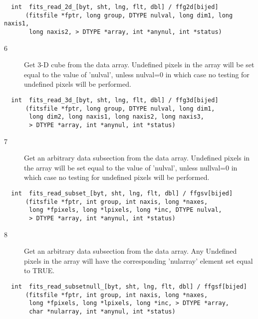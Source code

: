 \begin{verbatim}
  int  fits_read_2d_[byt, sht, lng, flt, dbl] / ffg2d[bijed]
      (fitsfile *fptr, long group, DTYPE nulval, long dim1, long naxis1,
       long naxis2, > DTYPE *array, int *anynul, int *status)
\end{verbatim}

\begin{description}
\item[6 ] Get 3-D cube from the data array.   Undefined
    pixels in the array will be set equal to the value of 'nulval',
    unless nulval=0 in which case no testing for undefined pixels will
   be performed.
\end{description}

\begin{verbatim}
  int  fits_read_3d_[byt, sht, lng, flt, dbl] / ffg3d[bijed]
      (fitsfile *fptr, long group, DTYPE nulval, long dim1,
       long dim2, long naxis1, long naxis2, long naxis3,
       > DTYPE *array, int *anynul, int *status)
\end{verbatim}


\begin{description}
\item[7 ]   Get an arbitrary data subsection from the data array.  Undefined
       pixels in the array will be set equal to the value of 'nulval',
       unless nullval=0 in which case no testing for undefined pixels will
      be performed.
\end{description}

\begin{verbatim}
  int  fits_read_subset_[byt, sht, lng, flt, dbl] / ffgsv[bijed]
      (fitsfile *fptr, int group, int naxis, long *naxes,
       long *fpixels, long *lpixels, long *inc, DTYPE nulval,
       > DTYPE *array, int *anynul, int *status)
\end{verbatim}

\begin{description}
\item[8 ]   Get an arbitrary data subsection from the data array.  Any Undefined
       pixels in the array will have the corresponding 'nularray'
      element set equal to TRUE.
\end{description}

\begin{verbatim}
  int  fits_read_subsetnull_[byt, sht, lng, flt, dbl] / ffgsf[bijed]
      (fitsfile *fptr, int group, int naxis, long *naxes,
       long *fpixels, long *lpixels, long *inc, > DTYPE *array,
       char *nularray, int *anynul, int *status)
\end{verbatim}



